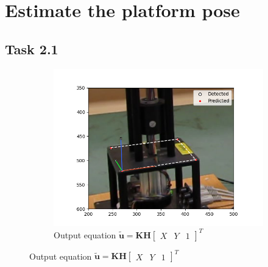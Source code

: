 \documentclass[a4paper]{article} %
\begin{document}
\section{Estimate the platform pose}
    \subsection*{Task 2.1}
    \begin{figure}[h]
        \centering
        \begin{subfigure}{0.45\textwidth}
            \centering
            \includegraphics[width= \textwidth]{../python/out_part2_1a}
            \caption{Output equation $\bm{\tilde{u}} = \bm{KH}
                \begin{bmatrix}
                    X & Y & 1
                \end{bmatrix}
            ^T$ }


\end{subfigure}
\end{figure}
\end{document}

